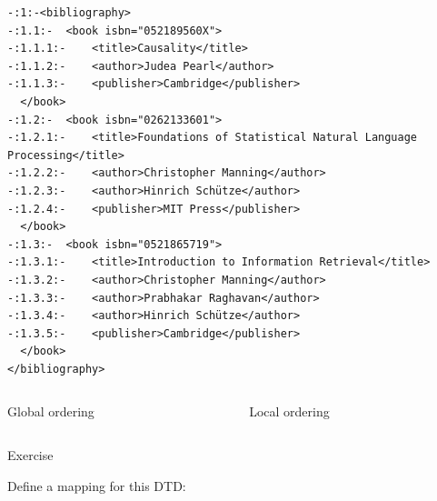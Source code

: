 \newsavebox\deweyOrdering
\begin{lrbox}{\deweyOrdering}
\begin{lstlisting}[style=markup]
-:1:-<bibliography>
-:1.1:-  <book isbn="052189560X">
-:1.1.1:-    <title>Causality</title>
-:1.1.2:-    <author>Judea Pearl</author>
-:1.1.3:-    <publisher>Cambridge</publisher>
  </book>
-:1.2:-  <book isbn="0262133601">
-:1.2.1:-    <title>Foundations of Statistical Natural Language Processing</title>
-:1.2.2:-    <author>Christopher Manning</author>
-:1.2.3:-    <author>Hinrich Schütze</author>
-:1.2.4:-    <publisher>MIT Press</publisher>
  </book>
-:1.3:-  <book isbn="0521865719">
-:1.3.1:-    <title>Introduction to Information Retrieval</title>
-:1.3.2:-    <author>Christopher Manning</author>
-:1.3.3:-    <author>Prabhakar Raghavan</author>
-:1.3.4:-    <author>Hinrich Schütze</author>
-:1.3.5:-    <publisher>Cambridge</publisher>
  </book>
</bibliography>
\end{lstlisting}
\end{lrbox}

\begin{frame}

\begin{columns}[onlytextwidth]
\begin{column}{0.45\textwidth}
\begin{block}{Global ordering}
\scalebox{0.75}{\clipbox{0pt 0pt 175pt 0pt}{\usebox\globalOrdering}}
\end{block}
\end{column}
\begin{column}{0.45\textwidth}
\begin{block}{Local ordering}
\scalebox{0.75}{\clipbox{0pt 0pt 185pt 0pt}{\usebox\deweyOrdering}}
\end{block}
\end{column}
\end{columns}
\end{frame}

\begin{frame}{Exercise}

Define a mapping for this DTD:

\usebox{\bibliographyDTD}
\end{frame}


